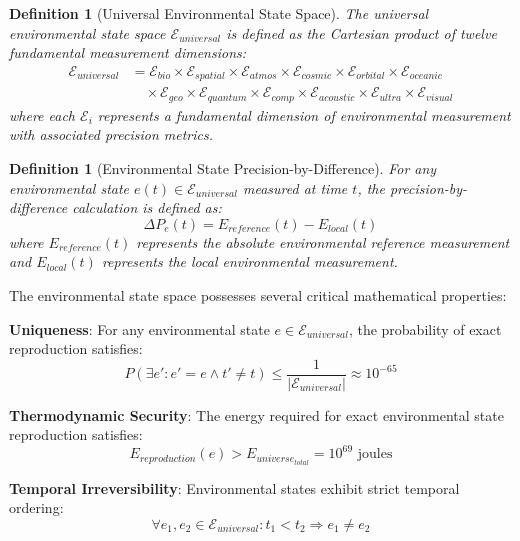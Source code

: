 \documentclass[12pt,a4paper]{article}
\newtheorem{definition}[theorem]{Definition}
\begin{document}
\begin{definition}[Universal Environmental State Space]
The universal environmental state space $\mathcal{E}_{universal}$ is defined as the Cartesian product of twelve fundamental measurement dimensions:
\begin{align}
\mathcal{E}_{universal} &= \mathcal{E}_{bio} \times \mathcal{E}_{spatial} \times \mathcal{E}_{atmos} \times \mathcal{E}_{cosmic} \times \mathcal{E}_{orbital} \times \mathcal{E}_{oceanic} \\
&\quad \times \mathcal{E}_{geo} \times \mathcal{E}_{quantum} \times \mathcal{E}_{comp} \times \mathcal{E}_{acoustic} \times \mathcal{E}_{ultra} \times \mathcal{E}_{visual}
\end{align}
where each $\mathcal{E}_i$ represents a fundamental dimension of environmental measurement with associated precision metrics.
\end{definition}

\begin{definition}[Environmental State Precision-by-Difference]
For any environmental state $e(t) \in \mathcal{E}_{universal}$ measured at time $t$, the precision-by-difference calculation is defined as:
\begin{equation}
\Delta P_e(t) = E_{reference}(t) - E_{local}(t)
\end{equation}
where $E_{reference}(t)$ represents the absolute environmental reference measurement and $E_{local}(t)$ represents the local environmental measurement.
\end{definition}

The environmental state space possesses several critical mathematical properties:

\textbf{Uniqueness}: For any environmental state $e \in \mathcal{E}_{universal}$, the probability of exact reproduction satisfies:
\begin{equation}
P(\exists e' : e' = e \land t' \neq t) \leq \frac{1}{|\mathcal{E}_{universal}|} \approx 10^{-65}
\end{equation}

\textbf{Thermodynamic Security}: The energy required for exact environmental state reproduction satisfies:
\begin{equation}
E_{reproduction}(e) > E_{universe_{total}} = 10^{69} \text{ joules}
\end{equation}

\textbf{Temporal Irreversibility}: Environmental states exhibit strict temporal ordering:
\begin{equation}
\forall e_1, e_2 \in \mathcal{E}_{universal} : t_1 < t_2 \Rightarrow e_1 \neq e_2
\end{equation}
\end{document}
